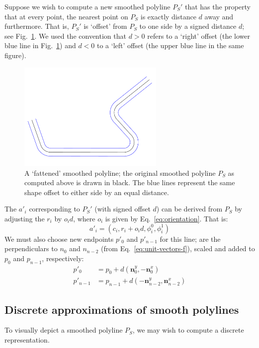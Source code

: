 \documentclass{article}
\begin{document}
Suppose we wish to compute a new smoothed polyline $P_S'$ that has the property that at every point, the nearest point on $P_S$ is exactly distance $d$ away and furthermore.  That is, $P_S'$ is `offset' from $P_S$ to one side by a signed distance $d$; see Fig.~\ref{fig:fattened-polyline}.  We used the convention that $d>0$ refers to a `right' offset (the lower blue line in Fig.~\ref{fig:fattened-polyline}) and $d<0$ to a `left' offset (the upper blue line in the same figure).
%
\begin{figure}[h]
  \centering
  \includegraphics[width=7cm]{5}
  \caption{A `fattened' smoothed polyline; the original smoothed polyline $P_S$ as computed above is drawn in black.  The blue lines represent the same shape offset to either side by an equal distance.}
  \label{fig:fattened-polyline}
\end{figure}
%
The $a'_i$ corresponding to $P_S'$ (with signed offset $d$) can be derived from $P_S$ by adjusting the $r_i$ by $o_id$, where $o_i$ is given by Eq.~\eqref{eq:orientation}.  That is:
%
\begin{equation}
  \label{eq:arc-offset}
  a'_i = \left(c_i, r_i + o_id, \phi^0_i, \phi^1_i\right)
\end{equation}
%
We must also choose new endpoints $p'_0$ and $p'_{n-1}$ for this line;  are the perpendiculars to $n_0$ and $n_{n-2}$ (from Eq.~\eqref{eq:unit-vectors-f}), scaled and added to $p_0$ and $p_{n-1}$, respectively:
%
\begin{align}
  \label{eq:endpoints-prime}
  p'_0 &= p_0 + d \left(\mathbf{n}_0^y, -\mathbf{n}_0^x\right)\\
  p'_{n-1} &= p_{n-1} + d \left(-\mathbf{n}_{n-2}^y, \mathbf{n}_{n-2}^x\right)
\end{align}
%
\subsection{Discrete approximations of smooth polylines}
%
To visually depict a smoothed polyline $P_S$, we may wish to compute a discrete representation.
%
\end{document}

